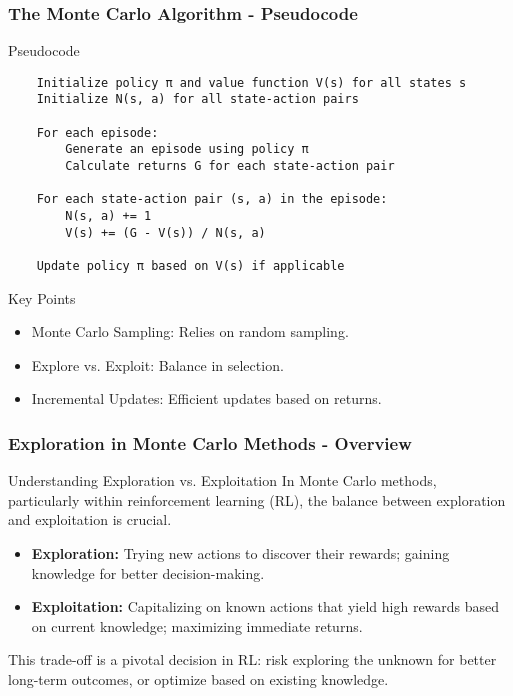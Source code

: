 \documentclass[aspectratio=169]{beamer}
\begin{document}
\begin{frame}[fragile]
    \frametitle{The Monte Carlo Algorithm - Pseudocode}
    \begin{block}{Pseudocode}
    \begin{lstlisting}
    Initialize policy π and value function V(s) for all states s
    Initialize N(s, a) for all state-action pairs

    For each episode:
        Generate an episode using policy π
        Calculate returns G for each state-action pair

    For each state-action pair (s, a) in the episode:
        N(s, a) += 1
        V(s) += (G - V(s)) / N(s, a)

    Update policy π based on V(s) if applicable
    \end{lstlisting}
    \end{block}

    \begin{block}{Key Points}
        \begin{itemize}
            \item Monte Carlo Sampling: Relies on random sampling.
            \item Explore vs. Exploit: Balance in selection.
            \item Incremental Updates: Efficient updates based on returns.
        \end{itemize}
    \end{block}
\end{frame}

\begin{frame}[fragile]
    \frametitle{Exploration in Monte Carlo Methods - Overview}
    \begin{block}{Understanding Exploration vs. Exploitation}
        In Monte Carlo methods, particularly within reinforcement learning (RL), the balance between exploration and exploitation is crucial.
    \end{block}
    \begin{itemize}
        \item \textbf{Exploration:} Trying new actions to discover their rewards; gaining knowledge for better decision-making.
        \item \textbf{Exploitation:} Capitalizing on known actions that yield high rewards based on current knowledge; maximizing immediate returns.
    \end{itemize}
    This trade-off is a pivotal decision in RL: risk exploring the unknown for better long-term outcomes, or optimize based on existing knowledge.
\end{frame}
\end{document}
